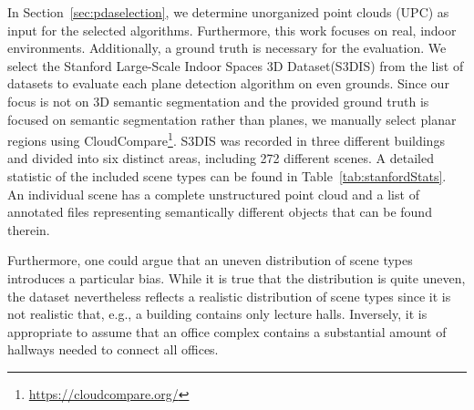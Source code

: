\documentclass[main.tex]{subfiles}
\begin{document}
In Section~\ref{sec:pdaselection}, we determine unorganized point clouds (UPC) as input for the selected algorithms. Furthermore, this work focuses on real, indoor environments.
Additionally, a ground truth is necessary for the evaluation.
We select the Stanford Large-Scale Indoor Spaces 3D Dataset(S3DIS)\cite{2017arXiv170201105A} from the list of datasets to evaluate each plane detection algorithm on even grounds.
Since our focus is not on 3D semantic segmentation and the provided ground truth is focused on semantic segmentation rather than planes, we manually select planar regions using CloudCompare\footnote{\href{https://cloudcompare.org/}{https://cloudcompare.org/}}.
S3DIS was recorded in three different buildings and divided into six distinct areas, including 272 different scenes. A detailed statistic of the included scene types can be found in Table~\ref{tab:stanfordStats}.
An individual scene has a complete unstructured point cloud and a list of annotated files representing semantically different objects that can be found therein.

Furthermore, one could argue that an uneven distribution of scene types introduces a particular bias. While it is true that the distribution is quite uneven, the dataset nevertheless reflects a realistic distribution of scene types since
it is not realistic that, e.g., a building contains only lecture halls. Inversely, it is appropriate to assume that an office complex contains a substantial amount of hallways needed to connect all offices.
\end{document}
